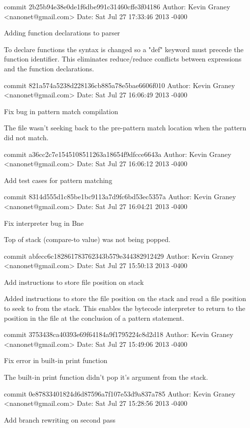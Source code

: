 commit 2b25b94e38e0de1f6dbe991c31460cffe3f04186
Author: Kevin Graney <nanonet@gmail.com>
Date:   Sat Jul 27 17:33:46 2013 -0400

    Adding function declarations to parser
    
    To declare functions the syntax is changed so a "def" keyword must
    precede the function identifier.  This eliminates reduce/reduce
    conflicts between expressions and the function declarations.

commit 821a574a5238d228136cb885a78e5bae6606f010
Author: Kevin Graney <nanonet@gmail.com>
Date:   Sat Jul 27 16:06:49 2013 -0400

    Fix bug in pattern match compilation
    
    The file wasn't seeking back to the pre-pattern match location when
    the pattern did not match.

commit a36cc2c7e1545108511263a18654f9dfcce6643a
Author: Kevin Graney <nanonet@gmail.com>
Date:   Sat Jul 27 16:06:12 2013 -0400

    Add test cases for pattern matching

commit 8314d555d1c85be1bc9113a7d9fc6bd53ec5357a
Author: Kevin Graney <nanonet@gmail.com>
Date:   Sat Jul 27 16:04:21 2013 -0400

    Fix interpreter bug in Bne
    
    Top of stack (compare-to value) was not being popped.

commit abfecc6c182861783762343b579e344382912429
Author: Kevin Graney <nanonet@gmail.com>
Date:   Sat Jul 27 15:50:13 2013 -0400

    Add instructions to store file position on stack
    
    Added instructions to store the file position on the stack and
    read a file position to seek to from the stack.  This enables the
    bytecode interpreter to return to the position in the file at
    the conclusion of a pattern statement.

commit 3753438ca40393e69f64184a9f1795224c8d2d18
Author: Kevin Graney <nanonet@gmail.com>
Date:   Sat Jul 27 15:49:06 2013 -0400

    Fix error in built-in print function
    
    The built-in print function didn't pop it's argument from the stack.

commit 0e87833401824d6d87596a7f107e53d9a837a785
Author: Kevin Graney <nanonet@gmail.com>
Date:   Sat Jul 27 15:28:56 2013 -0400

    Add branch rewriting on second pass

